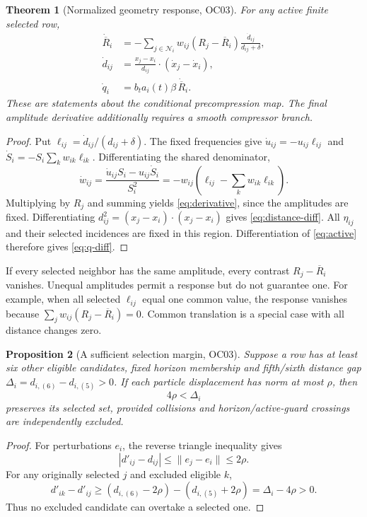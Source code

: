 \documentclass[11pt,a4paper]{article}
\newtheorem{theorem}{Theorem}[section]
\newtheorem{proposition}[theorem]{Proposition}
\theoremstyle{remark}\newtheorem{remark}[theorem]{Remark}
\newcommand{\Rbar}{\overline R}
\numberwithin{equation}{section}
\begin{document}
\begin{theorem}[Normalized geometry response, OC03]\label{thm:smooth}
For any active finite selected row,
\begin{align}
\dot{\Rbar}_i
&=-\sum_{j\in\mathcal N_i}w_{ij}(R_j-\Rbar_i)
          \frac{\dot d_{ij}}{d_{ij}+\delta},\label{eq:derivative}\\
\dot d_{ij}
&=\frac{x_j-x_i}{d_{ij}}\cdot(\dot x_j-\dot x_i),\label{eq:distance-diff}\\
\dot q_i&=b_ta_i(t)\beta\,\dot{\Rbar}_i.\label{eq:q-diff}
\end{align}
These are statements about the conditional precompression map. The final
amplitude derivative additionally requires a smooth compressor branch.
\end{theorem}
\begin{proof}
Put $\ell_{ij}=\dot d_{ij}/(d_{ij}+\delta)$. The fixed frequencies give
$\dot u_{ij}=-u_{ij}\ell_{ij}$ and
$\dot S_i=-S_i\sum_k w_{ik}\ell_{ik}$. Differentiating the shared denominator,
\begin{equation}
\dot w_{ij}
=\frac{\dot u_{ij}S_i-u_{ij}\dot S_i}{S_i^2}
=-w_{ij}\left(\ell_{ij}-\sum_k w_{ik}\ell_{ik}\right).
\label{eq:weight-diff}
\end{equation}
Multiplying by $R_j$ and summing yields \eqref{eq:derivative}, since the
amplitudes are fixed. Differentiating
$d_{ij}^2=(x_j-x_i)\cdot(x_j-x_i)$ gives \eqref{eq:distance-diff}.
All $\eta_{ij}$ and their selected incidences are fixed in this region.
Differentiation of \eqref{eq:active} therefore gives \eqref{eq:q-diff}.
\end{proof}

If every selected neighbor has the same amplitude, every contrast
$R_j-\Rbar_i$ vanishes. Unequal amplitudes permit a response but do not
guarantee one. For example, when all selected $\ell_{ij}$ equal one common
value, the response vanishes because
$\sum_jw_{ij}(R_j-\Rbar_i)=0$. Common translation is a special case with
all distance changes zero.

\begin{proposition}[A sufficient selection margin, OC03]\label{prop:margin}
Suppose a row has at least six other eligible candidates, fixed horizon
membership and fifth/sixth distance gap
$\Delta_i=d_{i,(6)}-d_{i,(5)}>0$.
If each particle displacement has norm at most $\rho$, then
\begin{equation}
4\rho<\Delta_i\label{eq:margin}
\end{equation}
preserves its selected set, provided collisions and horizon/active-guard
crossings are independently excluded.
\end{proposition}
\begin{proof}
For perturbations $e_i$, the reverse triangle inequality gives
\[
|d'_{ij}-d_{ij}|\le\|e_j-e_i\|\le2\rho.
\]
For any originally selected $j$ and excluded eligible $k$,
\[
d'_{ik}-d'_{ij}
\ge(d_{i,(6)}-2\rho)-(d_{i,(5)}+2\rho)
=\Delta_i-4\rho>0.
\]
Thus no excluded candidate can overtake a selected one.
\end{proof}
\end{document}
